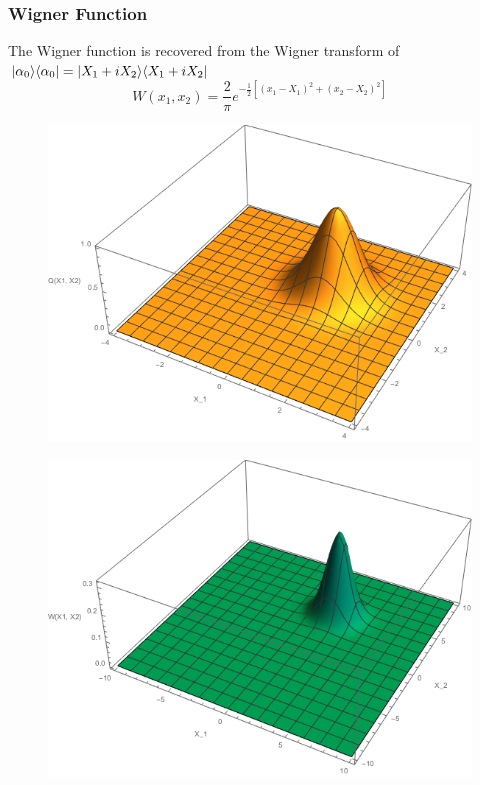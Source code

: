 \subsubsection{Wigner Function}
The Wigner function is recovered from the Wigner transform of $| \alpha_0 \rangle\langle \alpha_0 | = | X_1+iX_2 \rangle\langle X_1+iX_2 |$
\begin{equation}
	W(x_1, x_2) = \frac{2}{ \pi} e^{-\frac{1}{2}[(x_1-X_1)^2+(x_2-X_2)^2]}
\end{equation}
\begin{figure}[H]
	\begin{minipage}[b]{.5\linewidth}
		\centering \large \includegraphics[width=1\textwidth]{Images/Q Function - Coherent.png} 
		\label{fig:Qcoh}
	\end{minipage}%
	\begin{minipage}[b]{.5\linewidth}
		\centering\large \includegraphics[width = 1\textwidth]{Images/W Function - Coherent.png}
		 \label{fig:Wcoh}
	\end{minipage}
	\label{Coherents}
\end{figure}
